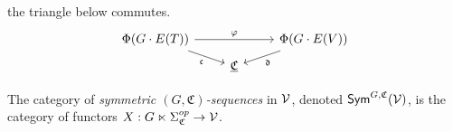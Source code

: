 \documentclass[a4paper,10pt
,draft
]{article}%
\renewcommand{\phi}{\varphi}
\newcommand{\UC}{\underline{\mathfrak C}}
\renewcommand{\1}{\ensuremath{\mathbb{id}}}
\begin{document}
\begin{remark}
{      the triangle below commutes.
      \begin{equation}
            \label{COLOR_MAP_FG_EQ}
            \begin{tikzcd}[row sep = tiny]
                  \Phi(G \cdot E(T)) \arrow[rr, "\phi"] \arrow[dr, "\mathfrak c"']
                  &&
                  \Phi(G \cdot E(V)) \arrow[dl, "\mathfrak d"]
                  \\
                  &
                  \UC
            \end{tikzcd}
      \end{equation}
      } %
\end{remark}

\begin{definition}
      The category of \textit{symmetric $(G,\mathfrak C)$-sequences} in $\mathcal V$, denoted $\mathsf{Sym}^{G,\mathfrak C}(\mathcal V)$, is
      the category of functors $X: G \ltimes \Sigma_{\mathfrak C}^{op} \to \mathcal V$.
\end{definition}
\end{document}
